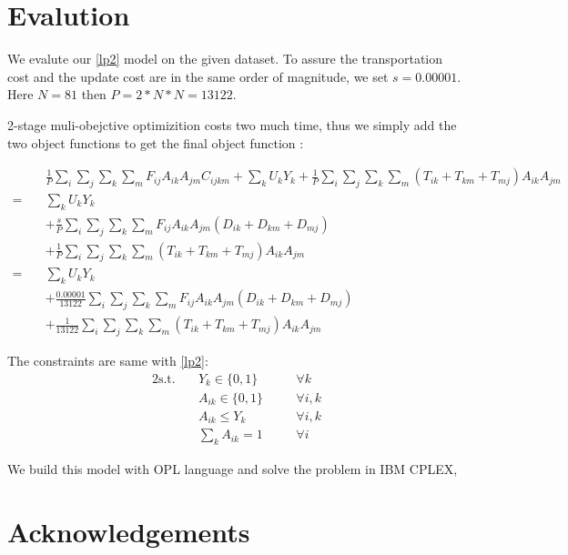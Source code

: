 \documentclass{llncs}
\begin{document}
\section{Evalution}
We evalute our \ref{lp2} model on the given dataset.
To assure the transportation cost and the update cost are in the same order of magnitude, we set $s=0.00001$. Here $N=81$ then $P = 2*N*N = 13122$. 

2-stage muli-obejctive optimizition costs two much time, thus we simply add the two object functions to get the final object function :

\begin{align}
	 \quad & \frac{1}{P} \sum_{i}\sum_{j}\sum_{k}\sum_{m}F_{ij}  A_{ik} A_{jm} C_{ijkm} + \sum_{k}U_k Y_{k} 
	 + \frac{1}{P} \sum_{i}\sum_{j}\sum_{k}\sum_{m}{(T_{ik}+ T_{km}+ T_{mj} ) A_{ik} A_{jm}} \nonumber \\
	 = \quad &   \sum_{k}U_k Y_{k} \nonumber \\
	 & + \frac{s}{P} \sum_{i}\sum_{j}\sum_{k}\sum_{m}F_{ij}  A_{ik} A_{jm} (D_{ik}+D_{km}+D_{mj}) \nonumber\\
     & + \frac{1}{P} \sum_{i}\sum_{j}\sum_{k}\sum_{m}{(T_{ik}+ T_{km}+ T_{mj} ) A_{ik} A_{jm}}	 \nonumber\\
     = \quad &\sum_{k}U_k Y_{k} \nonumber\\
     & + \frac{0.00001}{13122} \sum_{i}\sum_{j}\sum_{k}\sum_{m}F_{ij}  A_{ik} A_{jm} (D_{ik}+D_{km}+D_{mj})   \nonumber\\
     & + \frac{1}{13122} \sum_{i}\sum_{j}\sum_{k}\sum_{m}{(T_{ik}+ T_{km}+ T_{mj} ) A_{ik} A_{jm}}
\end{align}

The constraints are same with \ref{lp2}:
\begin{alignat}{2}
	\mbox{s.t.}  \quad
	&Y_{k} \in \{0,1\} &\quad& \forall k \label{st1.1}\\ 
	&A_{ik} \in \{0,1\} &\quad& \forall i,k \label{st1.2}\\ 
	&A_{ik} \leq Y_{k} &\quad& \forall i,k \label{st1.3}\\
	&\sum_{k}{A_{ik}} = 1 &\quad& \forall i \label{st1.4}
\end{alignat}

We build this model with OPL language and solve the problem in IBM CPLEX, 


	
	\section*{Acknowledgements}
	
\end{document}
